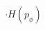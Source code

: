 \documentclass[preview]{standalone}
\begin{document}
\begin{align*}
\cdot H(p_\phi)
\end{align*}
\end{document}
